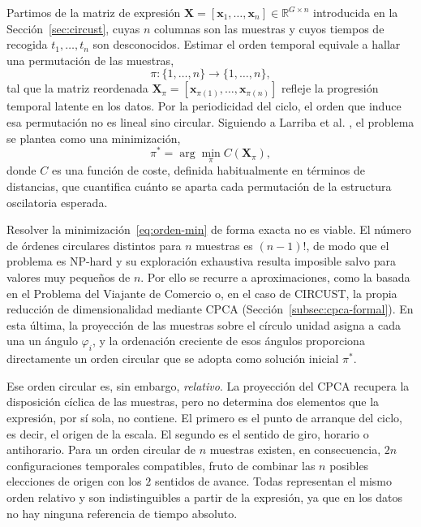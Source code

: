 \documentclass[12pt, a4paper]{report}
\begin{document}
Partimos de la matriz de expresión $\mathbf{X}=[\mathbf{x}_1,\dots,\mathbf{x}_n]\in\mathbb{R}^{G\times n}$ introducida en la Sección~\ref{sec:circust}, cuyas $n$ columnas son las muestras y cuyos tiempos de recogida $t_1,\dots,t_n$ son desconocidos. Estimar el orden temporal equivale a hallar una permutación de las muestras,
\begin{equation}
    \pi:\{1,\dots,n\}\to\{1,\dots,n\},
    \label{eq:permutacion}
\end{equation}
tal que la matriz reordenada $\mathbf{X}_\pi = [\mathbf{x}_{\pi(1)},\dots,\mathbf{x}_{\pi(n)}]$ refleje la progresión temporal latente en los datos. Por la periodicidad del ciclo, el orden que induce esa permutación no es lineal sino circular. Siguiendo a Larriba et al. \cite{larriba2020}, el problema se plantea como una minimización,
\begin{equation}
    \pi^* = \arg\min_{\pi} C(\mathbf{X}_\pi),
    \label{eq:orden-min}
\end{equation}
donde $C$ es una función de coste, definida habitualmente en términos de distancias, que cuantifica cuánto se aparta cada permutación de la estructura oscilatoria esperada.

Resolver la minimización~\eqref{eq:orden-min} de forma exacta no es viable. El número de órdenes circulares distintos para $n$ muestras es $(n-1)!$, de modo que el problema es NP-hard y su exploración exhaustiva resulta imposible salvo para valores muy pequeños de $n$. Por ello se recurre a aproximaciones, como la basada en el Problema del Viajante de Comercio \cite{larriba2020} o, en el caso de CIRCUST, la propia reducción de dimensionalidad mediante CPCA (Sección~\ref{subsec:cpca-formal}). En esta última, la proyección de las muestras sobre el círculo unidad asigna a cada una un ángulo $\varphi_i$, y la ordenación creciente de esos ángulos proporciona directamente un orden circular que se adopta como solución inicial $\pi^*$.

Ese orden circular es, sin embargo, \emph{relativo}. La proyección del CPCA recupera la disposición cíclica de las muestras, pero no determina dos elementos que la expresión, por sí sola, no contiene. El primero es el punto de arranque del ciclo, es decir, el origen de la escala. El segundo es el sentido de giro, horario o antihorario. Para un orden circular de $n$ muestras existen, en consecuencia, $2n$ configuraciones temporales compatibles, fruto de combinar las $n$ posibles elecciones de origen con los $2$ sentidos de avance. Todas representan el mismo orden relativo y son indistinguibles a partir de la expresión, ya que en los datos no hay ninguna referencia de tiempo absoluto.
\end{document}
